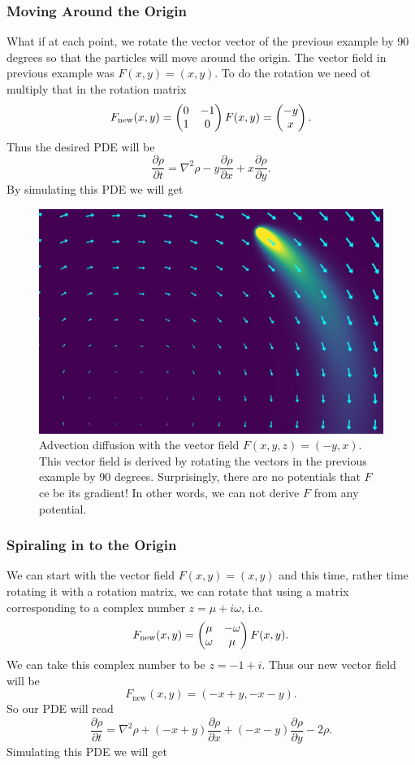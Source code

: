 \subsubsection{Moving Around the Origin}
What if at each point, we rotate the vector vector of the previous example by 90 degrees so that the particles will move around the origin. The vector field in previous example was $ F(x,y) = (x,y) $. To do the rotation we need ot multiply that in the rotation matrix
\[ F_\text{new}(x,y)=  \begin{pmatrix} 0 & -1 \\ 1 & 0 \end{pmatrix}F(x,y) = \begin{pmatrix} -y \\ x \end{pmatrix}.  \]
Thus the desired PDE will be
\[ \frac{\partial \rho}{\partial t} = \nabla^2 \rho - y\frac{\partial \rho}{\partial x} + x \frac{\partial \rho}{\partial y}. \]
By simulating this PDE we will get
\begin{figure}[h!]
	\centering
	\includegraphics[width=0.7\linewidth]{images/movingAround.png}
	\caption{Advection diffusion with the vector field $ F(x,y,z) = (-y,x)$. This vector field is derived by rotating the vectors in the previous example by 90 degrees. Surprisingly, there are no potentials that $ F $ ce be its gradient! In other words, we can not derive $ F $ from any potential.}
	\label{fig:simpleadvectiondiffusion1}
\end{figure}

\FloatBarrier

\subsubsection{Spiraling in to the Origin}
We can start with the vector field $ F(x,y) = (x,y) $ and this time, rather time rotating it with a rotation matrix, we can rotate that using a matrix corresponding to a complex number $ z = \mu + i \omega $, i.e.
\[ F_\text{new}(x,y) = \begin{pmatrix} \mu & -\omega \\ \omega & \mu \end{pmatrix}F(x,y). \]
We can take this complex number to be $ z = -1 + i $. Thus our new vector field will be
\[ F_\text{new}(x,y) = (-x+y, -x-y).  \]
So our PDE will read
\[ \frac{\partial \rho}{\partial t} = \nabla^2 \rho + (-x+y)\frac{\partial \rho}{\partial x} + (-x-y)\frac{\partial \rho}{\partial y} - 2\rho. \]
Simulating this PDE we will get

